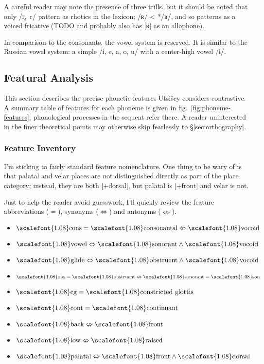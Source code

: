 \documentclass[12pt]{book} %
\newcommand{\mathipa}[1]{\textrm{\scalefont{1.08}\selectfont #1}} %
\begin{document}
A careful reader may note the presence of three trills, but it should be noted that only /r̥,~r/ pattern as rhotics in the lexicon; /ʀ/ < */ʁ/, and so patterns as a voiced fricative (TODO and probably also has [ʁ] as an allophone).

In comparison to the consonants, the vowel system is reserved.
It is similar to the Russian vowel system: a simple /i, e, a, o, u/ with a center-high vowel /ɨ/.

\subsection{Featural Analysis}

This section describes the precise phonetic features Utsišcy considers contrastive.
A summary table of features for each phoneme is given in fig.\ \ref{fig:phoneme-features}; phonological processes in the sequent refer there.
A reader uninterested in the finer theoretical points may otherwise skip fearlessly to \S\ref{sec:orthography}.

\subsubsection{Feature Inventory}

I'm sticking to fairly standard feature nomenclature.
One thing to be wary of is that palatal and velar places are not distinguished directly as part of the place category; instead, they are both [+dorsal], but palatal is [+front] and velar is not.

Just to help the reader avoid guesswork, I'll quickly review the feature abbreviations ($=$), synonyms ($\Leftrightarrow$) and antonyms ($\nLeftrightarrow$).
\begin{multicols}{2}
\begin{itemize}
\item $\mathipa{cons} = \mathipa{consonantal} \nLeftrightarrow \mathipa{vocoid}$
\item $\mathipa{vowel} \Leftrightarrow \mathipa{sonorant} \land \mathipa{vocoid}$
\item $\mathipa{glide} \Leftrightarrow \mathipa{obstruent} \land \mathipa{vocoid}$
\item $\mathipa{obs} = \mathipa{obstruent} \nLeftrightarrow \mathipa{sonorant} = \mathipa{son}$
\item $\mathipa{cg} = \mathipa{constricted glottis}$
\item $\mathipa{cont} = \mathipa{continuant}$
\item $\mathipa{back} \nLeftrightarrow \mathipa{front}$
\item $\mathipa{low} \nLeftrightarrow \mathipa{raised}$
\item $\mathipa{palatal} \Leftrightarrow \mathipa{front} \land \mathipa{dorsal}$
\end{itemize}
\end{multicols}
\end{document}
